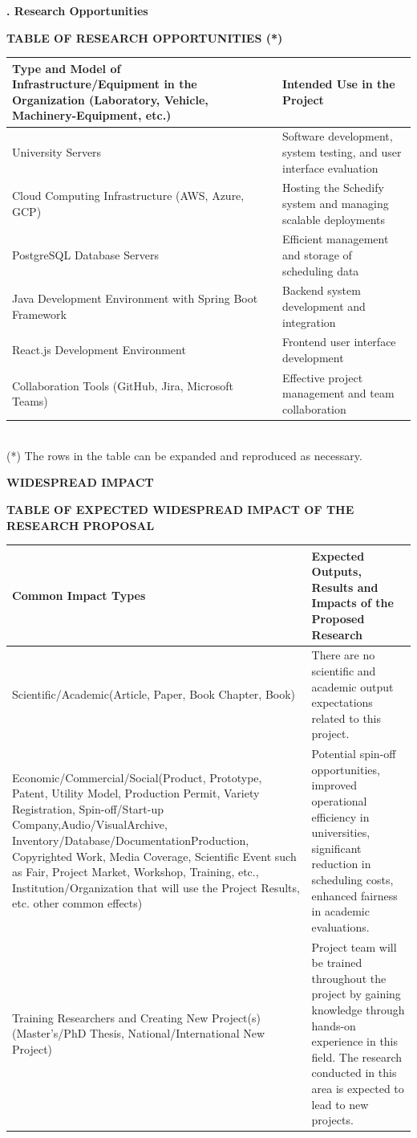 \documentclass[10pt,a4paper]{article}
\newcommand{\sectionlabel}[1]{\vspace{1.2em}\noindent\textbf{\fontsize{10.5}{12}\selectfont #1}\par\vspace{0.4em}}
\newcommand{\subhead}[1]{\vspace{0.8em}\noindent\textbf{\fontsize{10}{11}\selectfont #1}\par\vspace{0.3em}}
\begin{document}
\vspace{1.5em}
\subhead{3.3. Research Opportunities}
\begin{center}\textbf{TABLE OF RESEARCH OPPORTUNITIES (*)}\end{center}
\begin{tabularx}{\textwidth}{|Y|Y|}
\hline
\textbf{Type and Model of Infrastructure/Equipment in the Organization (Laboratory, Vehicle, Machinery-Equipment, etc.)} & \textbf{Intended Use in the Project} \\ \hline
University Servers & Software development, system testing, and user interface evaluation \\ \hline
Cloud Computing Infrastructure (AWS, Azure, GCP) & Hosting the Schedify system and managing scalable deployments \\ \hline
PostgreSQL Database Servers & Efficient management and storage of scheduling data \\ \hline
Java Development Environment with Spring Boot Framework & Backend system development and integration \\ \hline
React.js Development Environment & Frontend user interface development \\ \hline
Collaboration Tools (GitHub, Jira, Microsoft Teams) & Effective project management and team collaboration \\ \hline
\end{tabularx}\\[0.5em]
\small{(*) The rows in the table can be expanded and reproduced as necessary.}

\clearpage
\sectionlabel{WIDESPREAD IMPACT}
\begin{center}\textbf{TABLE OF EXPECTED WIDESPREAD IMPACT OF THE RESEARCH PROPOSAL}\end{center}
\begin{tabularx}{\textwidth}{|P{0.4\textwidth}|Y|}
\hline
\textbf{Common Impact Types} & \textbf{Expected Outputs, Results and Impacts of the Proposed Research} \\ \hline
Scientific/Academic(Article, Paper, Book Chapter, Book) & There are no scientific and academic output expectations related to this project. \\ \hline
Economic/Commercial/Social(Product, Prototype, Patent, Utility Model, Production Permit, Variety Registration, Spin-off/Start-up Company,Audio/VisualArchive, Inventory/Database/DocumentationProduction, Copyrighted Work, Media Coverage, Scientific Event such as Fair, Project Market, Workshop, Training, etc., Institution/Organization that will use the Project Results, etc. other common effects) & Potential spin-off opportunities, improved operational efficiency in universities, significant reduction in scheduling costs, enhanced fairness in academic evaluations. \\ \hline
Training Researchers and Creating New Project(s)(Master's/PhD Thesis, National/International New Project) & Project team will be trained throughout the project by gaining knowledge through hands-on experience in this field. The research conducted in this area is expected to lead to new projects. \\ \hline
\end{tabularx}
\end{document}
